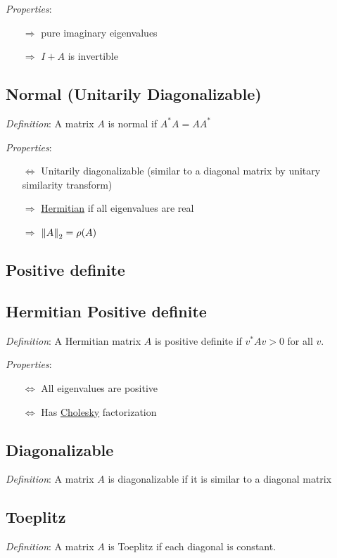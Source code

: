 \documentclass[12pt]{article}
\begin{document}
\textit{Properties}:
\begin{itemize}[nolistsep]
    \item[\(\Rightarrow\)] pure imaginary eigenvalues
    \item[\(\Rightarrow\)] \( I+A \) is invertible
\end{itemize}


\subsection{Normal (Unitarily Diagonalizable)}
\label{sec:normal}
\textit{Definition}: A matrix \( A \) is normal if \( A^*A = AA^* \)

\textit{Properties}:
\begin{itemize}[nolistsep]
    \item[\(\Leftrightarrow\)] Unitarily diagonalizable (similar to a diagonal matrix by unitary similarity transform)
    \item[\(\Rightarrow\)] \hyperref[sec:hermitian]{Hermitian} if all eigenvalues are real
    \item[\(\Rightarrow\)] \( \left\lVert A\right\rVert_2 = \rho(A) \)
\end{itemize}

\subsection{Positive definite}

\subsection{Hermitian Positive definite}
\textit{Definition}: A Hermitian matrix \( A \) is positive definite if \( v^*Av > 0 \) for all \( v \).

\textit{Properties}:
\begin{itemize}[nolistsep]
    \item[\(\Leftrightarrow\)] All eigenvalues are positive
    \item[\(\Leftrightarrow\)] Has \hyperref[sec:cholesky]{Cholesky} factorization
\end{itemize}

\subsection{Diagonalizable}
\textit{Definition}: A matrix \( A \) is diagonalizable if it is similar to a diagonal matrix


\subsection{Toeplitz}
\textit{Definition}: A matrix \( A \) is Toeplitz if each diagonal is constant.
\end{document}
